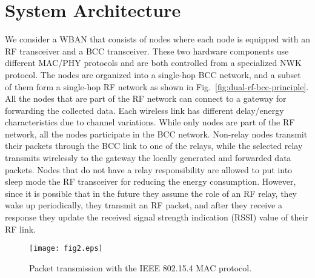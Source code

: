 \documentclass[10pt]{IEEEtran}
\newcounter{section:outage-analysis}
\begin{document}
\section{System Architecture}
\label{section:system-architecture}
We consider a WBAN that consists of  nodes where each node is equipped with an RF transceiver and a BCC transceiver. These two hardware components use different MAC/PHY protocols and are both controlled from a specialized NWK protocol. The nodes are organized into a single-hop BCC network, and a subset  of them form a single-hop RF network as shown in Fig.~\ref{fig:dual-rf-bcc-principle}. All the nodes that are part of the RF network can connect to a gateway for forwarding the collected data. Each wireless link has different delay/energy characteristics due to channel variations. While only  nodes are part of the RF network, all the  nodes participate in the BCC network. Non-relay nodes transmit their packets through the BCC link to one of the relays, while the selected relay transmits wirelessly to the gateway the locally generated and forwarded data packets. Nodes that do not have a relay responsibility are allowed to put into sleep mode the RF transceiver for reducing the energy consumption. However, since it is possible that in the future they assume the role of an RF relay, they wake up periodically, they transmit an RF packet, and after they receive a response they update the received signal strength indication (RSSI) value of their RF link.



\begin{figure}[t]
\begin{center}
  \texttt{[image: fig2.eps]}
  \caption{Packet transmission with the IEEE 802.15.4 MAC protocol.}
  \label{fig:rf-mac-protocol}
\end{center}
\end{figure}
\end{document}
